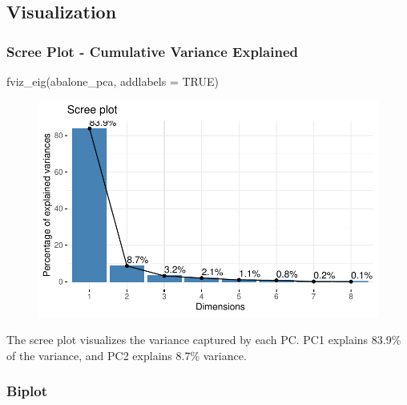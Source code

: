 \documentclass[
  letterpaper,
  DIV=11,
  numbers=noendperiod]{scrreprt}
\newenvironment{Shaded}{\begin{snugshade}}{\end{snugshade}}
\newcommand{\AttributeTok}[1]{\textcolor[rgb]{0.40,0.45,0.13}{#1}}
\newcommand{\ConstantTok}[1]{\textcolor[rgb]{0.56,0.35,0.01}{#1}}
\newcommand{\FunctionTok}[1]{\textcolor[rgb]{0.28,0.35,0.67}{#1}}
\newcommand{\NormalTok}[1]{\textcolor[rgb]{0.00,0.23,0.31}{#1}}
\begin{document}
\hypertarget{visualization}{%
\subsection{Visualization}\label{visualization}}

\hypertarget{scree-plot---cumulative-variance-explained}{%
\subsubsection{Scree Plot - Cumulative Variance
Explained}\label{scree-plot---cumulative-variance-explained}}

\begin{Shaded}
\begin{Highlighting}[]
\FunctionTok{fviz\_eig}\NormalTok{(abalone\_pca, }\AttributeTok{addlabels =} \ConstantTok{TRUE}\NormalTok{)}
\end{Highlighting}
\end{Shaded}

\begin{figure}[H]

{\centering \includegraphics{examples_files/figure-pdf/unnamed-chunk-11-1.pdf}

}

\end{figure}

The scree plot visualizes the variance captured by each PC. PC1 explains
83.9\% of the variance, and PC2 explains 8.7\% variance.

\hypertarget{biplot}{%
\subsubsection{Biplot}\label{biplot}}
\end{document}
